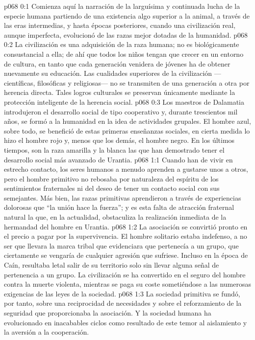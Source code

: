 \author{Melquisedec}
\vs p068 0:1 Comienza aquí la narración de la larguísima y continuada lucha de la especie humana partiendo de una existencia algo superior a la animal, a través de las eras intermedias, y hasta épocas posteriores, cuando una civilización real, aunque imperfecta, evolucionó de las razas mejor dotadas de la humanidad.
\vs p068 0:2 La civilización es una adquisición de la raza humana; no es biológicamente consustancial a ella; de ahí que todos los niños tengan que crecer en un entorno de cultura, en tanto que cada generación venidera de jóvenes ha de obtener nuevamente su educación. Las cualidades superiores de la civilización ---científicas, filosóficas y religiosas--- no se transmiten de una generación a otra por herencia directa. Tales logros culturales se preservan únicamente mediante la protección inteligente de la herencia social.
\vs p068 0:3 Los maestros de Dalamatia introdujeron el desarrollo social de tipo cooperativo y, durante trescientos mil años, se formó a la humanidad en la idea de actividades grupales. El hombre azul, sobre todo, se benefició de estas primeras enseñanzas sociales, en cierta medida lo hizo el hombre rojo y, menos que los demás, el hombre negro. En los últimos tiempos, son la raza amarilla y la blanca las que han demostrado tener el desarrollo social más avanzado de Urantia.
\vs p068 1:1 Cuando han de vivir en estrecho contacto, los seres humanos a menudo aprenden a gustarse unos a otros, pero el hombre primitivo no rebosaba por naturaleza del espíritu de los sentimientos fraternales ni del deseo de tener un contacto social con sus semejantes. Más bien, las razas primitivas aprendieron a través de experiencias dolorosas que “la unión hace la fuerza”; y es esta falta de atracción fraternal natural la que, en la actualidad, obstaculiza la realización inmediata de la hermandad del hombre en Urantia.
\vs p068 1:2 La asociación se convirtió pronto en el precio a pagar por la supervivencia. El hombre solitario estaba indefenso, a no ser que llevara la marca tribal que evidenciara que pertenecía a un grupo, que ciertamente se vengaría de cualquier agresión que sufriese. Incluso en la época de Caín, resultaba letal salir de su territorio solo sin llevar alguna señal de pertenencia a un grupo. La civilización se ha convertido en el seguro del hombre contra la muerte violenta, mientras se paga su coste sometiéndose a las numerosas exigencias de las leyes de la sociedad.
\vs p068 1:3 La sociedad primitiva se fundó, por tanto, sobre una reciprocidad de necesidades y sobre el reforzamiento de la seguridad que proporcionaba la asociación. Y la sociedad humana ha evolucionado en inacabables ciclos como resultado de este temor al aislamiento y la aversión a la cooperación.
